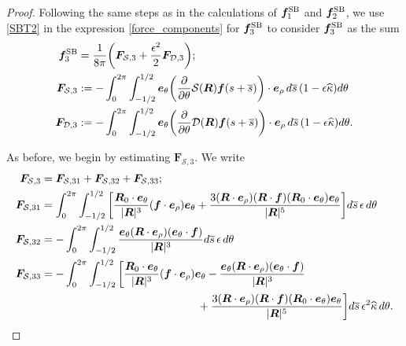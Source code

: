 \documentclass[11pt]{article}
\numberwithin{equation}{section}
\newcommand{\bars}{\overline s}
\newcommand{\be}{\bm{e}}
\newcommand{\p}{\partial}
\newcommand{\ts}{\thinspace}
\newcommand{\SB}{{\rm SB}}
\newcommand{\wh}[1]{\widehat{#1}}
\newcommand{\mc}[1]{\mathcal{#1}}
\theoremstyle{definition}
\begin{document}
\begin{proof}
Following the same steps as in the calculations of $\bm{f}^{\SB}_1$ and $\bm{f}^{\SB}_2$, we use \eqref{SBT2} in the expression \eqref{force_components} for $\bm{f}^{\SB}_3$ to consider $\bm{f}^{\SB}_3$ as the sum 
\begin{equation}\label{force_3}
\begin{aligned}
\bm{f}^{\SB}_3 &=\frac{1}{8\pi}\bigg(\bm{F}_{\mc{S},3} +\frac{\epsilon^2}{2}\bm{F}_{\mc{D},3}\bigg); \\
\bm{F}_{\mc{S},3} &:= -\int_0^{2\pi}\int_{-1/2}^{1/2} \be_\theta \bigg(\frac{\p}{\p\theta}\mc{S}(\bm{R})\bm{f}(s+\bars)\bigg)\cdot\be_\rho \ts d\bars \ts (1-\epsilon\wh\kappa)d\theta \\
\bm{F}_{\mc{D},3}&:=  -\int_0^{2\pi}\int_{-1/2}^{1/2} \be_\theta \bigg(\frac{\p}{\p\theta}\mc{D}(\bm{R})\bm{f}(s+\bars)\bigg)\cdot\be_\rho \ts d\bars \ts (1-\epsilon\wh\kappa) d\theta.
\end{aligned}
\end{equation}

As before, we begin by estimating $\bm{F}_{\mc{S},3}$. We write
\begin{equation}\label{FS3}
\begin{aligned}
\bm{F}_{\mc{S},3} &= \bm{F}_{\mc{S},31} + \bm{F}_{\mc{S},32} + \bm{F}_{\mc{S},33} ; \\
%
\bm{F}_{\mc{S},31} &= \int_0^{2\pi}\int_{-1/2}^{1/2} \bigg[\frac{\bm{R}_0\cdot\be_{\theta}}{|\bm{R}|^3}({\bm f}\cdot\be_{\rho})\be_\theta +\frac{3(\bm{R}\cdot\be_\rho)(\bm{R}\cdot\bm{f})(\bm{R}_0\cdot\be_{\theta})\be_\theta}{|\bm{R}|^5} \bigg] d\bars \ts \epsilon \ts d\theta \\
%
\bm{F}_{\mc{S},32} &= -\int_0^{2\pi}\int_{-1/2}^{1/2} \frac{\be_\theta(\bm{R}\cdot\be_\rho)(\be_{\theta}\cdot\bm{f})}{|\bm{R}|^3} d\bars \ts \epsilon \ts d\theta \\
%
\bm{F}_{\mc{S},33} &= -\int_0^{2\pi}\int_{-1/2}^{1/2} \bigg[\frac{\bm{R}_0\cdot\be_{\theta}}{|\bm{R}|^3}({\bm f}\cdot\be_{\rho})\be_\theta - \frac{\be_\theta(\bm{R}\cdot\be_\rho)(\be_{\theta}\cdot\bm{f})}{|\bm{R}|^3} \\
&\hspace{5cm} +\frac{3(\bm{R}\cdot\be_\rho)(\bm{R}\cdot\bm{f})(\bm{R}_0\cdot\be_{\theta})\be_\theta}{|\bm{R}|^5} \bigg] d\bars \ts \epsilon^2\wh\kappa \ts d\theta.
\end{aligned}
\end{equation}


\end{proof}
\end{document}

